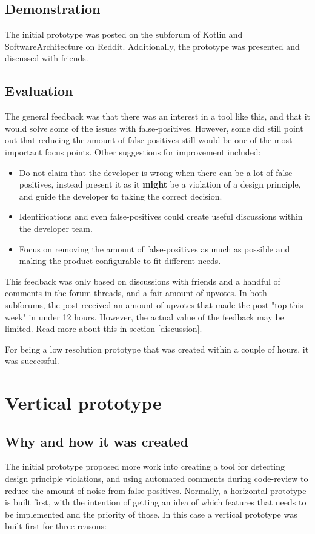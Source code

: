 \documentclass{report}
\begin{document}
\subsection*{Demonstration}
The initial prototype was posted on the subforum of Kotlin\cite{kotlin-reddit} and SoftwareArchitecture\cite{softwarearch-reddit} on Reddit. Additionally, the prototype was presented and discussed with friends. 

\subsection*{Evaluation}

The general feedback was that there was an interest in a tool like this, and that it would solve some of the issues with false-positives. However, some did still point out that reducing the amount of false-positives still would be one of the most important focus points. Other suggestions for improvement included: 
\begin{itemize}
    \item Do not claim that the developer is wrong when there can be a lot of false-positives, instead present it as it \textbf{might} be a violation of a design principle, and guide the developer to taking the correct decision.
    \item Identifications and even false-positives could create useful discussions within the developer team.
    \item Focus on removing the amount of false-positives as much as possible and making the product configurable to fit different needs.
\end{itemize}

This feedback was only based on discussions with friends and a handful of comments in the forum threads, and a fair amount of upvotes. In both subforums, the post received an amount of upvotes that made the post "top this week" in under 12 hours. However, the actual value of the feedback may be limited. Read more about this in section \ref{discussion}. 

For being a low resolution prototype that was created within a couple of hours, it was successful.


\section{Vertical prototype}
\label{vertical-prototype}
\subsection*{Why and how it was created}
The initial prototype proposed more work into creating a tool for detecting design principle violations, and using automated comments during code-review to reduce the amount of noise from false-positives. Normally, a horizontal prototype is built first, with the intention of getting an idea of which features that needs to be implemented and the priority of those. In this case a vertical prototype was built first for three reasons:
\end{document}
